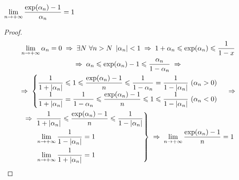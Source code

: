 \begin{theorem}
    $\displaystyle \lim_{n\to+\infty} \frac{\exp(\alpha_n) - 1}{\alpha_n} = 1$
\end{theorem}
\begin{proof}
    \begin{multline*}
        \limpinf \alpha_n = 0 \thus
        \exists N\ \forall n > N\ \abs{\alpha_n} < 1 \thus 1 + \alpha_n \le \exp(\alpha_n) \le \frac{1}{1 - x} \\
        \thus \alpha_n \le \exp(\alpha_n) - 1 \le \frac{\alpha_n}{1 - \alpha_n} \thus \\
        \thus
        \begin{cases}
            \dfrac{1}{1 + \abs{\alpha_n}} \le 1 \le \dfrac{\exp(\alpha_n) - 1}{n} \le \dfrac{1}{1 - \alpha_n} = \dfrac{1}{1 - \abs{\alpha_n}}\ (\alpha_n > 0) \\
            \dfrac{1}{1 + \abs{\alpha_n}} = \dfrac{1}{1 - \alpha_n} \le \dfrac{\exp(\alpha_n) - 1}{n} \le 1 \le \dfrac{1}{1 - \abs{\alpha_n}}\ (\alpha_n < 0)
        \end{cases}
        \thus \\
        \begin{rcases}
            \thus \dfrac{1}{1 + \abs{\alpha_n}} \le \dfrac{\exp(\alpha_n) - 1}{n} \le \dfrac{1}{1 - \abs{\alpha_n}} \\
            \phantom{\thus{ }} \displaystyle \limpinf \frac{1}{1 - \abs{\alpha_n}} = 1 \\
            \phantom{\thus{ }} \displaystyle \limpinf \frac{1}{1 + \abs{\alpha_n}} = 1
        \end{rcases} \thus \limpinf \frac{\exp(\alpha_n) - 1}{n} = 1
    \end{multline*}
\end{proof}
